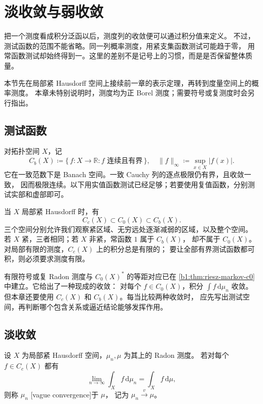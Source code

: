 \section{淡收敛与弱收敛}
\label{b1:sec:1201}

把一个测度看成积分泛函以后，测度列的收敛便可以通过积分值来定义。
不过，测试函数的范围不能省略。同一列概率测度，用紧支集函数测试可能趋于零，
用常函数测试却始终得到一。这里的差别不是记号上的习惯，而是是否保留整体质量。

\ProseParagraphBreak

本节先在局部紧 Hausdorff 空间上接续前一章的表示定理，再转到度量空间上的概率测度。
本章未特别说明时，测度均为正 Borel 测度；需要符号或复测度时会另行指出。

\subsection{测试函数}
\label{b1:subsec:120101}

对拓扑空间 \(X\)，记
\[
 C_b(X)\coloneqq\{\,f:X\to\mathbb R:f\text{ 连续且有界}\,\},
 \quad \|f\|_\infty\coloneqq\sup_{x\in X}|f(x)|.
\]
它在一致范数下是 Banach 空间。一致 Cauchy 列的逐点极限仍有界，且收敛一致，
因而极限连续。以下用实值函数测试已经足够；若要使用复值函数，分别测试实部和虚部即可。

\ProseParagraphBreak

当 \(X\) 局部紧 Hausdorff 时，有
\[
 C_c(X)\subset C_0(X)\subset C_b(X).
\]
三个空间分别允许我们观察紧区域、无穷远处逐渐减弱的区域，以及整个空间。
若 \(X\) 紧，三者相同；若 \(X\) 非紧，常函数 \(1\) 属于 \(C_b(X)\)，
却不属于 \(C_0(X)\)。对局部有限的测度，\(C_c(X)\) 上的积分总是有限的；
要让全部有界测试函数都可积，则必须要求测度有限。

\ProseParagraphBreak

有限符号或复 Radon 测度与 \(C_0(X)^*\) 的等距对应已在%
\cref{b1:thm:riesz-markov-c0}中建立。它给出了一种现成的\WeakStar{}收敛：
对每个 \(f\in C_0(X)\)，积分 \(\int f\,\mathrm{d}\mu_n\) 收敛。
但本章还要使用 \(C_c(X)\) 和 \(C_b(X)\)。每当比较两种收敛时，
应先写出测试空间，再判断哪个包含关系或逼近结论能够发挥作用。

\subsection{淡收敛}
\label{b1:subsec:120102}

\begin{definition}\label{b1:def:vague-convergence}
设 \(X\) 为局部紧 Hausdorff 空间，\(\mu_n,\mu\) 为其上的 Radon 测度。
若对每个 \(f\in C_c(X)\) 都有
\[
 \lim_{n\to\infty}\int_X f\,\mathrm{d}\mu_n=\int_X f\,\mathrm{d}\mu,
\]
则称 \(\mu_n\) [vague convergence]于 \(\mu\)，
记为 \(\mu_n\xrightarrow{v}\mu\)。
\end{definition}

